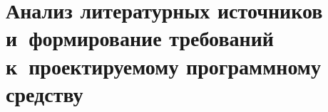 \section{Анализ литературных источников и~формирование
требований к~проектируемому программному средству}
\label{sec:analysis}